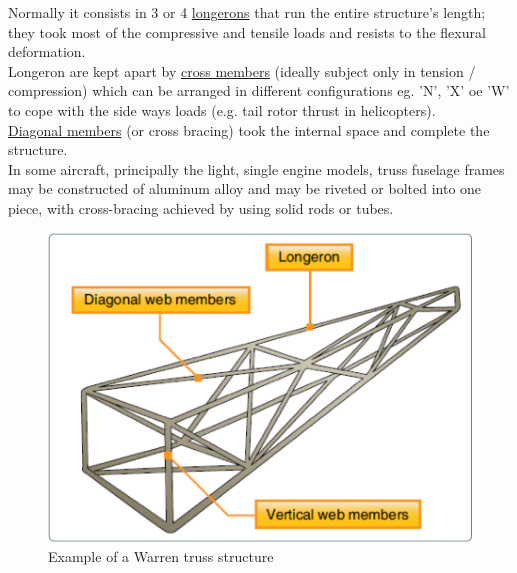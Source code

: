 \smallskip
\noindent 
Normally it consists in 3 or 4 \underline{longerons} that run the entire structure's length; they took most of the compressive and tensile loads and resists to the flexural deformation. \\
Longeron are kept apart by \underline{cross members} (ideally subject only in tension / compression) which can be arranged in different configurations eg. 'N', 'X' oe 'W' to cope with the side ways loads (e.g. tail rotor thrust in helicopters). \\
\underline{Diagonal members} (or cross bracing) took the internal space and complete the structure. \\
In some aircraft, principally the light, single engine
models, truss fuselage frames may be constructed of
aluminum alloy and may be riveted or bolted into one piece,
with cross-bracing achieved by using solid rods or tubes. \\

\noindent


\smallskip
\begin{figure}[h!]
	\begin{center}
		\centering  		 		
		\includegraphics[width=0.7\linewidth]{PICTURES/1_Theory/PNG/truss_members.png}
	\end{center}
	\caption {Example of a Warren truss structure}
\end{figure}



\clearpage
\noindent 
